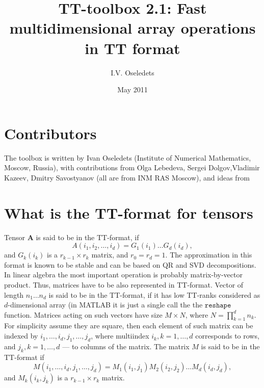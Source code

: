 \documentclass[a4paper,12pt,twoside]{article}
\date{May 2011}
\title{TT-toolbox 2.1: Fast multidimensional array operations in TT format }
\author{I.V. Oseledets}
\def\A{{\mathbf{A}}}
\begin{document}
\maketitle

\section{Contributors}
  The toolbox is written by Ivan Oseledets (Institute of Numerical Mathematics, Moscow, Russia), 
with contributions from Olga Lebedeva, Sergei Dolgov,Vladimir Kazeev, Dmitry Savostyanov (all are from INM RAS Moscow),
and ideas from  
\section{What is the TT-format for tensors}
Tensor $\A$ is said to be in the TT-format, if 
$$A(i_1,i_2,\ldots,i_d) = G_1(i_1) \ldots G_d(i_d),$$
and $G_k(i_k)$ is a $r_{k-1} \times r_k$ matrix, and $r_0 =r_d = 1$.  The approximation in this format is known to be
stable and can be based on QR and SVD decompositions. In linear algebra the most important operation
is probably matrix-by-vector product. Thus, matrices have to be also represented in TT-format.
Vector of length $n_1 \ldots n_d$ is said to be in the TT-format, if it has low TT-ranks considered
as $d$-dimensional array (in MATLAB it is just a single call the the $\texttt{reshape}$ function. 
Matrices acting on such vectors have size $M \times N$, where $N=\prod_{k=1}^d n_k$. For simplicity
assume they are square, then each element of such matrix can be indexed by $i_1,\ldots,i_d, j_1,\ldots,j_d$,
where multiindex $i_k, k=1,\ldots,d$ corresponds to rows, and $j_k,k=1,\ldots,d$ --- to columns of the
matrix. The matrix $M$ is said to be in the TT-format if 
$$M(i_1,\ldots,i_d,j_1,\ldots,j_d) = M_1(i_1,j_1) M_2(i_2,j_2) \ldots M_d(i_d,j_d),$$
and $M_k(i_k,j_k)$ is a $r_{k-1} \times r_k$ matrix. 
\end{document}
